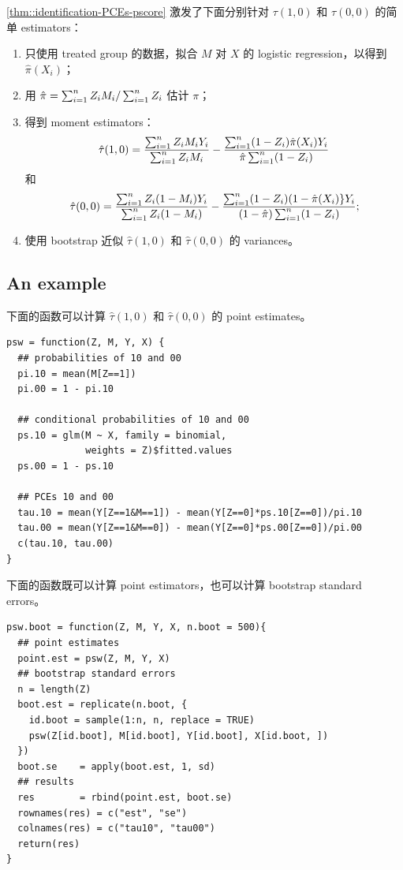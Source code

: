  
\cref{thm::identification-PCEs-pscore} 激发了下面分别针对 $\tau(1,0)$ 和 $\tau(0,0)$ 的简单 estimators：
\begin{enumerate}
\item
只使用 treated group 的数据，拟合 $M$ 对 $X$ 的 logistic regression，以得到 $\hat \pi(X_i)$；
\item
用 $\hat \pi =  \sum_{i=1}^n Z_i M_i / \sum_{i=1}^n Z_i$ 估计 $\pi$；
\item
得到 moment estimators：
$$
\hat \tau(1,0) =  \frac{  \sum_{i=1}^n Z_iM_iY_i  }{ \sum_{i=1}^n Z_iM_i }   -   \frac{   \sum_{i=1}^n (1-Z_i) \hat \pi(X_i) Y_i  }{ \hat \pi   \sum_{i=1}^n (1-Z_i) }   
$$
和
$$
\hat \tau(0,0) =  \frac{  \sum_{i=1}^n Z_i(1-M_i)Y_i  }{ \sum_{i=1}^n Z_i (1-M_i) }  - \frac{  \sum_{i=1}^n (1-Z_i)(1-\hat \pi(X_i)\} Y_i  }{  (1- \hat \pi )\sum_{i=1}^n (1-Z_i)  }
;
$$
\item
使用 bootstrap 近似 $\hat \tau(1,0)$ 和 $\hat \tau(0,0)$ 的 variances。
\end{enumerate}
 
 
 
 
 \subsection{An example}

下面的函数可以计算 $\hat \tau(1,0)$ 和 $\hat \tau(0,0)$ 的 point estimates。

  \begin{lstlisting}
psw = function(Z, M, Y, X) {
  ## probabilities of 10 and 00
  pi.10 = mean(M[Z==1])
  pi.00 = 1 - pi.10
  
  ## conditional probabilities of 10 and 00
  ps.10 = glm(M ~ X, family = binomial, 
              weights = Z)$fitted.values
  ps.00 = 1 - ps.10
  
  ## PCEs 10 and 00 
  tau.10 = mean(Y[Z==1&M==1]) - mean(Y[Z==0]*ps.10[Z==0])/pi.10
  tau.00 = mean(Y[Z==1&M==0]) - mean(Y[Z==0]*ps.00[Z==0])/pi.00
  c(tau.10, tau.00)
}
   \end{lstlisting}

下面的函数既可以计算 point estimators，也可以计算 bootstrap standard errors。
  \begin{lstlisting}
psw.boot = function(Z, M, Y, X, n.boot = 500){
  ## point estimates
  point.est = psw(Z, M, Y, X)
  ## bootstrap standard errors
  n = length(Z)  
  boot.est = replicate(n.boot, {
    id.boot = sample(1:n, n, replace = TRUE)
    psw(Z[id.boot], M[id.boot], Y[id.boot], X[id.boot, ])
  })
  boot.se    = apply(boot.est, 1, sd)
  ## results
  res        = rbind(point.est, boot.se)
  rownames(res) = c("est", "se")
  colnames(res) = c("tau10", "tau00")
  return(res)
}
    \end{lstlisting}
    

